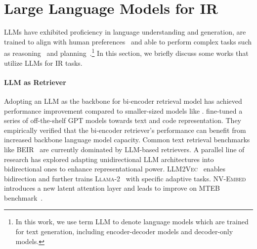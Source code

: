 
\section{Large Language Models for IR}
\label{sec:llm4ir}
LLMs have exhibited proficiency in language understanding and generation, are trained to align with human preferences~\cite{achiam2023gpt,team2023gemini,bai2022constitutional} and able to perform complex tasks such as reasoning~\cite{wei2022chain,guo2025deepseek} and planning~\cite{song2023llm}.\footnote{In this work, we use term LLM to denote language models which are trained for text generation, including encoder-decoder models and decoder-only models.}
In this section, we briefly discuss some works that utilize LLMs for IR tasks.

\paragraph{LLM as Retriever}
Adopting an LLM as the backbone for bi-encoder retrieval model has achieved performance improvement compared to smaller-sized models like \bert. 
\citet{neelakantan2022text} fine-tuned a series of off-the-shelf \textsc{GPT} models towards text and code representation. 
They empirically verified that the bi-encoder retriever's performance can benefit from increased backbone language model capacity. Common text retrieval benchmarks like BEIR~\cite{thakur2021beir} are currently dominated by LLM-based retrievers. 
A parallel line of research has explored adapting unidirectional LLM architectures into bidirectional ones to enhance representational power. 
\textsc{LLM2Vec}~\cite{behnamghader2024llmvec} enables bidirection and further trains \textsc{Llama}-2~\cite{touvron2023llama} with specific adaptive tasks. \textsc{NV-Embed}~\cite{lee2024nvembed} introduces a new latent attention layer and leads to improve on MTEB benchmark~\cite{muennighoff-etal-2023-mteb}.

